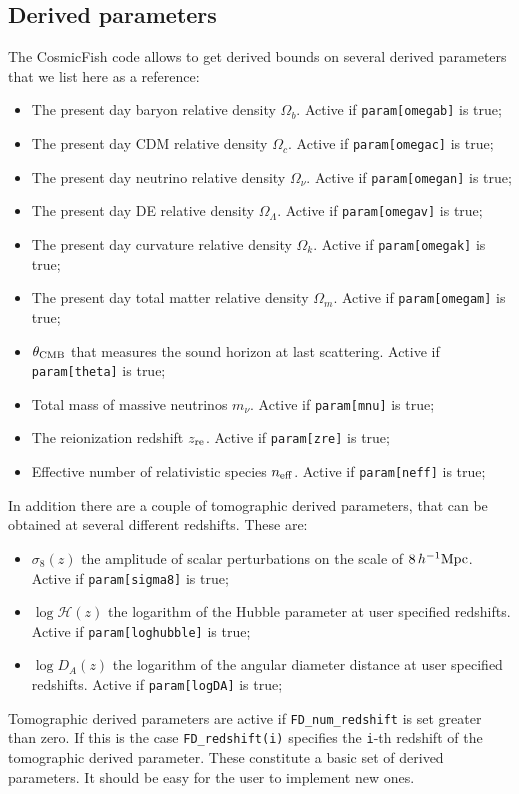 \documentclass[prd,nofootinbib,showpacs]{revtex4}
\newcommand{\code}[1]{\lstinline|#1|}
\begin{document}
\subsection{Derived parameters}
%
The CosmicFish code allows to get derived bounds on several derived parameters that we list here as a reference:
%
\begin{itemize}
\item The present day baryon relative density $\Omega_b$. Active if \code{param[omegab]} is true;
\item The present day CDM relative density $\Omega_c$. Active if \code{param[omegac]} is true;
\item The present day neutrino relative density $\Omega_\nu$. Active if \code{param[omegan]} is true;
\item The present day DE relative density $\Omega_\Lambda$. Active if \code{param[omegav]} is true;
\item The present day curvature relative density $\Omega_k$. Active if \code{param[omegak]} is true;
\item The present day total matter relative density $\Omega_m$. Active if \code{param[omegam]} is true;
\item $\theta_{\rm CMB}$ that measures the sound horizon at last scattering. Active if \code{param[theta]} is true;
\item Total mass of massive neutrinos $m_{\nu}$. Active if \code{param[mnu]} is true;
\item The reionization redshift $z_{\rm re}$. Active if \code{param[zre]} is true;
\item Effective number of relativistic species $n_{\rm eff}$. Active if \code{param[neff]} is true;
\end{itemize}
%
In addition there are a couple of tomographic derived parameters, that can be obtained at several different redshifts. These are:
%
\begin{itemize}
\item $\sigma_{8}(z)$ the amplitude of scalar perturbations on the scale of $8\, h^{-1}{\rm Mpc}$. Active if \code{param[sigma8]} is true;
\item $\log \mathcal{H}(z)$ the logarithm of the Hubble parameter at user specified redshifts. Active if \code{param[loghubble]} is true;
\item $\log D_{A}(z)$ the logarithm of the angular diameter distance at user specified redshifts. Active if \code{param[logDA]} is true;
\end{itemize}
%
Tomographic derived parameters are active if \code{FD_num_redshift} is set greater than zero. If this is the case \code{FD_redshift(i)} specifies the \code{i}-th redshift of the tomographic derived parameter.
These constitute a basic set of derived parameters. It should be easy for the user to implement new ones.
\end{document}
